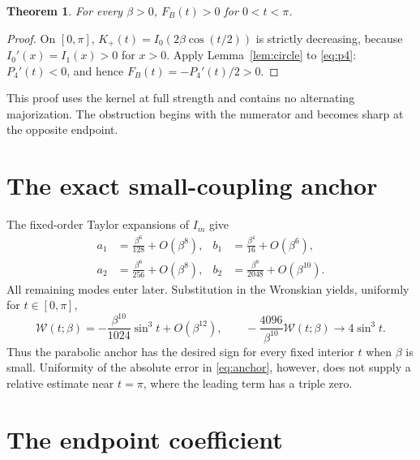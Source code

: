 \documentclass[11pt]{article}
\newtheorem{theorem}{Theorem}
\theoremstyle{definition}
\theoremstyle{remark}
\newcommand{\FB}{F_{\!B}}
\newcommand{\W}{\mathcal W}
\begin{document}
\begin{theorem}\label{thm:fb}
For every $\beta>0$, $\FB(t)>0$ for $0<t<\pi$.
\end{theorem}

\begin{proof}
On $[0,\pi]$, $K_+(t)=I_0(2\beta\cos(t/2))$ is strictly decreasing,
because $I_0'(x)=I_1(x)>0$ for $x>0$.  Apply
Lemma~\ref{lem:circle} to \eqref{eq:p4}: $P_4'(t)<0$, and hence
$\FB(t)=-P_4'(t)/2>0$.
\end{proof}

This proof uses the kernel at full strength and contains no alternating
majorization.  The obstruction begins with the numerator and becomes sharp
at the opposite endpoint.

\section{The exact small-coupling anchor}

The fixed-order Taylor expansions of $I_m$ give
\begin{align*}
 a_1&=\frac{\beta^6}{128}+O(\beta^8),&
 b_1&=\frac{\beta^4}{16}+O(\beta^6),\\
 a_2&=\frac{\beta^6}{256}+O(\beta^8),&
 b_2&=\frac{\beta^8}{2048}+O(\beta^{10}).
\end{align*}
All remaining modes enter later.  Substitution in the Wronskian yields,
uniformly for $t\in[0,\pi]$,
\begin{equation}\label{eq:anchor}
 \W(t;\beta)=-\frac{\beta^{10}}{1024}\sin^3t+O(\beta^{12}),
 \qquad
 -\frac{4096}{\beta^{10}}\W(t;\beta)\longrightarrow4\sin^3t.
\end{equation}
Thus the parabolic anchor has the desired sign for every fixed interior
$t$ when $\beta$ is small.  Uniformity of the absolute error in
\eqref{eq:anchor}, however, does not supply a relative estimate near
$t=\pi$, where the leading term has a triple zero.

\section{The endpoint coefficient}
\end{document}
